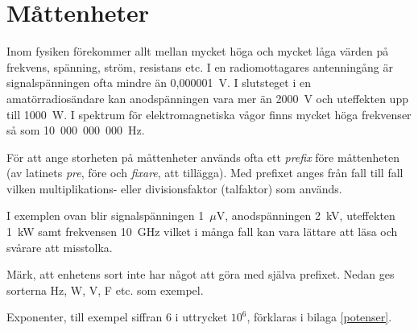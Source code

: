 \chapter{Måttenheter}

  Inom fysiken förekommer allt mellan mycket höga och mycket låga
  värden på frekvens, spänning, ström, resistans etc.
  I en radiomottagares antenningång är signalspänningen ofta mindre än
  0,000001~V.
  I slutsteget i en amatörradiosändare kan anodspänningen vara mer än 2000~V och
  uteffekten upp till 1000~W.
  I spektrum för elektromagnetiska vågor finns mycket höga frekvenser så som 10~000~000~000~Hz.

  För att ange storheten på måttenheter används ofta ett \emph{prefix} före
  måttenheten (av latinets \emph{pre}, före och \emph{fixare}, att tillägga).
  Med prefixet anges från fall till fall vilken multiplikations- eller
  divisionsfaktor (talfaktor) som används.

  I exemplen ovan blir signalspänningen 1~\(\mu\)V, anodspänningen 2~kV,
  uteffekten 1~kW samt frekvensen 10~GHz vilket i många fall kan vara lättare
  att läsa och svårare att misstolka.
 
  Märk, att enhetens sort inte har något att göra med själva prefixet.
  Nedan ges sorterna Hz, W, V, F etc. som exempel.

  Exponenter, till exempel siffran 6 i uttrycket \(10^6\), förklaras i
  bilaga \ref{potenser}.

